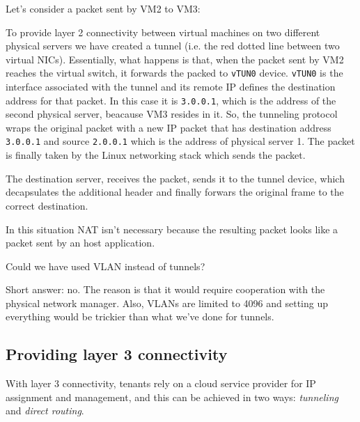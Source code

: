\begin{eg}
    Let's consider a packet sent by VM2 to VM3:

    \begin{figure}[h!]
        \centering
    \end{figure}

    \noindent
    To provide layer 2 connectivity between virtual machines on two different
    physical servers we have created a tunnel (i.e. the red dotted line between
    two virtual NICs). Essentially, what happens is that, when the packet sent
    by VM2 reaches the virtual switch, it forwards the packed to \texttt{vTUN0}
    device. \texttt{vTUN0} is the interface associated with the tunnel and its
    remote IP defines the destination address for that packet. In this
    case it is \texttt{3.0.0.1}, which is the address of the second physical
    server, beacause VM3 resides in it. So, the tunneling protocol wraps the
    original packet with a new IP packet that has destination address
    \texttt{3.0.0.1} and source \texttt{2.0.0.1} which is the address of physical
    server 1. The packet is finally taken by the Linux networking stack which
    sends the packet.

    The destination server, receives the packet, sends it to the tunnel
    device, which decapsulates the additional header and finally forwars the
    original frame to the correct destination.
\end{eg}
\begin{note}
    In this situation NAT isn't necessary because the resulting packet looks
    like a packet sent by an host application.
\end{note}

\noindent
Could we have used VLAN instead of tunnels?

Short answer: no. The reason is that it would require cooperation with the
physical network manager. Also, VLANs are limited to 4096 and setting up
everything would be trickier than what we've done for tunnels.

\subsection{Providing layer 3 connectivity}
With layer 3 connectivity, tenants rely on a cloud service provider for IP
assignment and management, and this can be achieved in two ways:
\emph{tunneling} and \emph{direct routing}.

